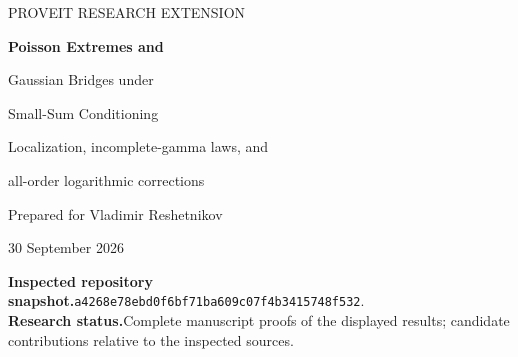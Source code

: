 \documentclass[11pt,a4paper]{article}
\numberwithin{equation}{section}
\theoremstyle{definition}
\theoremstyle{remark}
\newcommand{\Pp}{\mathbb P}
\newcommand{\ind}{\mathbf 1}
\newcommand{\commit}{\texttt{a4268e78ebd0f6bf71ba609c07f4b3415748f532}}
\begin{document}
\hypersetup{pageanchor=false}
\begin{titlepage}
\vspace*{7mm}
{\large\sffamily PROVEIT RESEARCH EXTENSION\par}
\vspace{13mm}
{\Huge\bfseries Poisson Extremes and\par Gaussian Bridges under\par Small-Sum Conditioning\par}
\vspace{8mm}
{\Large Localization, incomplete-gamma laws, and\par all-order logarithmic corrections\par}
\vspace{9mm}
{\normalsize Prepared for Vladimir Reshetnikov\par
30 September 2026\par}
\vspace{10mm}
\begin{abstract}
For a positive summable weight sequence, let $S=\sum_j w_jU_j$, with
independent uniform $U_j$ on $[0,1]$, and condition on $S\le x$ as
$x\downarrow0$. We investigate the locations and heights of the largest
summands, jointly with the fluctuation process of the whole configuration.
For $w_j=j^{-p}$, $p>1$, write $N=t^{1/p}$ for the effective dimension at the
mean-matching exponential tilt $t$, put $\beta=1/p$, and define
$b+\beta\log b=\log N$. We prove, uniformly for bounded $z$,
\[
 \log\Pp\!\left(\max_j tj^{-p}U_j\le b+z\mid S\le x\right)
 =-N\Gamma(1-\beta,b+z)+O_p(N^{-1/2}).
\]
Consequently every fixed-order logarithmic correction is explicit. The
extremal point process, with locations divided by $N/b^\beta$, tends to a
Poisson process of intensity $\ind_{[0,1]}(u)\,du\,e^{-z}dz$. It is jointly
independent in the limit of the variance-clock Brownian bridge and the
exponential distance from the conditioning boundary.

For every uniformly lacunary weight sequence, we also prove the full
marked Poisson limit and its joint independence from the bridge and the
boundary distance. This settles the qualitative point-process and
independence portions of Question~7 in the repository's lacunary-conditioning
report; that question's quantitative-rate requirement remains open.
The polynomial extreme-location scale and the all-order maximum law are
additional extensions. Proofs, reproducible symbolic checks, and numerical
Fourier-inversion diagnostics are supplied. No Lean certification,
external refereeing, or exhaustive worldwide priority determination is claimed.
\end{abstract}
\vfill
\noindent\small
\textbf{Inspected repository snapshot.}\quad\commit.\\
\textbf{Research status.}\quad Complete manuscript proofs of the displayed
results; candidate contributions relative to the inspected sources.
\end{titlepage}
\hypersetup{pageanchor=true}
\tableofcontents
\clearpage
{}
\end{document}
